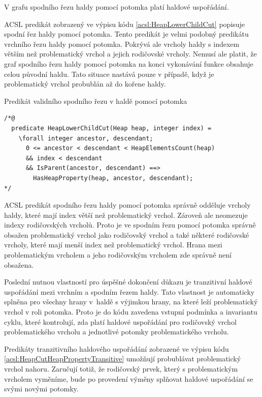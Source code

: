 \begin{remark}
	V grafu spodního řezu haldy pomocí potomka platí haldové uspořádání.
\end{remark}

ACSL predikát zobrazený ve výpisu kódu \ref{acsl:HeapLowerChildCut} popisuje spodní řez haldy pomocí potomka. Tento predikát je velmi podobný predikátu vrchního řezu haldy pomocí potomka. Pokrývá ale vrcholy haldy s indexem větším než problematický vrchol a jejich rodičovské vrcholy. Nemusí ale platit, že graf spodního řezu haldy pomocí potomka na konci vykonávání funkce obsahuje celou původní haldu. Tato situace nastává pouze v případě, když je problematický vrchol probublán až do kořene haldy.

\begin{listing}[H]
	\caption{Predikát validního spodního řezu v haldě pomocí potomka}
	\label{acsl:HeapLowerChildCut}
	\begin{verbatim}
/*@
  predicate HeapLowerChildCut(Heap heap, integer index) =
    \forall integer ancestor, descendant;
      0 <= ancestor < descendant < HeapElementsCount(heap)
      && index < descendant
      && IsParent(ancestor, descendant) ==>
        HasHeapProperty(heap, ancestor, descendant);
*/
	\end{verbatim}
\end{listing}

ACSL predikát spodního řezu haldy pomocí potomka správně odděluje vrcholy haldy, které mají index větší než problematický vrchol. Zároveň ale neomezuje indexy rodičovských vrcholů. Proto je ve spodním řezu pomocí potomka správně obsažen problematický vrchol jako rodičovský vrchol a také některé rodičovské vrcholy, které mají menší index než problematický vrchol. Hrana mezi problematickým vrcholem a jeho rodičovským vrcholem zde správně není obsažena.

Poslední nutnou vlastností pro úspěšné dokončení důkazu je tranzitivní haldové uspořádání mezi vrchním a spodním řezem haldy. Tato vlastnost je automaticky splněna pro všechny hrany v~haldě s výjimkou hrany, na které leží problematický vrchol v roli potomka. Proto je do kódu zavedena vstupní podmínka a invariantu cyklu, které kontrolují, zda platí haldové uspořádání pro rodičovský vrchol problematického vrcholu a jednotlivé potomky problematického vrcholu.

Predikáty tranzitivního haldového uspořádání zobrazené ve výpisu kódu \ref{acsl:HeapCutHeapPropertyTransitive} umožňují probublávat problematický vrchol nahoru. Zaručují totiž, že rodičovský prvek, který s problematickým vrcholem vyměníme, bude po provedení výměny splňovat haldové uspořádání se svými novými potomky.

